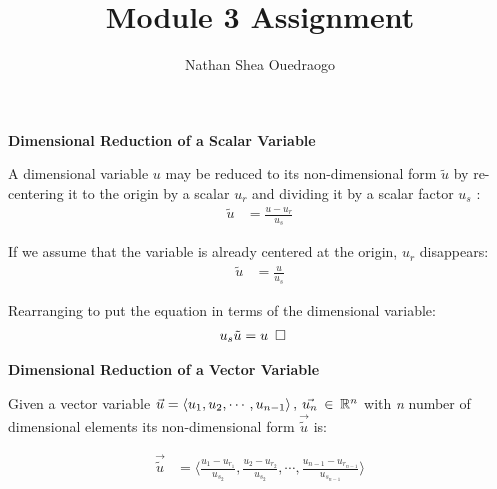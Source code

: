 \documentclass[titlepage]{article}
\begin{document}

\title{\textbf{Module 3 Assignment}}
\author{Nathan Shea Ouedraogo}
\date{}
\maketitle

\section{}
\begin{center}
    \large
    \textbf{Dimensional Reduction of a Scalar Variable}
\end{center}
\normalsize

\noindent A dimensional variable $u$ may be reduced to its non-dimensional form $\tilde{u}$ by re-centering it to the origin by a scalar $u_{r}$ and dividing it by a scalar factor $u_{s}$ :
\begin{align}
    \tilde{u} &= \displaystyle\frac{u-u_{r}}{u_{s}}
\end{align}

\noindent If we assume that the variable is already centered at the origin, $u_{r}$ disappears:
\begin{align}
    \tilde{u} &= \displaystyle\frac{u}{u_{s}}
\end{align}

\noindent Rearranging to put the equation in terms of the dimensional variable: 
\begin{align}
    u_{s}\tilde{u} &= u\hspace*{5pt}\square
\end{align}

\begin{center}
    \large
    \textbf{Dimensional Reduction of a Vector Variable}
\end{center}
\normalsize

\noindent Given a vector variable 
$\vec{u}=\left<u_{1},u_{2},\cdots,u_{n-1}\right>,\hspace*{2pt}\vec{u_{n}}\hspace*{2pt}\in\hspace*{2pt}\mathbb{R}^n$ 
with \emph{n} number of dimensional elements its non-dimensional form $\vec{\tilde{u}}$ is:

\begin{align}
    \vec{\tilde{u}} &= \langle{\displaystyle\frac{u_{1}-u_{r_{1}}}{u_{s_{2}}}, \displaystyle\frac{u_{2}-u_{r_{2}}}{u_{s_{2}}}, \cdots, \displaystyle\frac{u_{n-1}-u_{r_{n-1}}}{u_{s_{n-1}}}}\rangle
\end{align}
\end{document}
